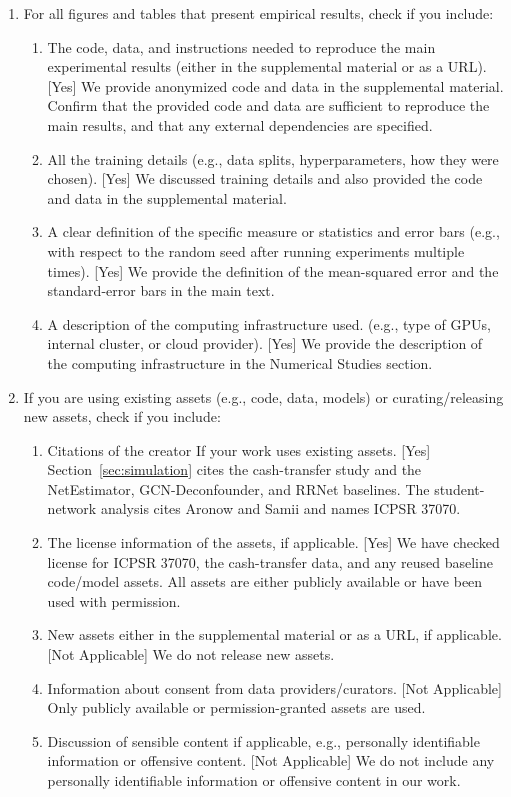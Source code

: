 \documentclass[twoside]{article}
\theoremstyle{plain}
\theoremstyle{definition}
\theoremstyle{remark}
\begin{document}
\begin{enumerate}
  \item For all figures and tables that present empirical results, check if you include:
  \begin{enumerate}
    \item The code, data, and instructions needed to reproduce the main experimental results (either in the supplemental material or as a URL). [Yes] We provide anonymized code and data in the supplemental material. Confirm that the provided code and data are sufficient to reproduce the main results, and that any external dependencies are specified.
    \item All the training details (e.g., data splits, hyperparameters, how they were chosen). [Yes] We discussed training details and also provided the code and data in the supplemental material.
    \item A clear definition of the specific measure or statistics and error bars (e.g., with respect to the random seed after running experiments multiple times). [Yes] We provide the definition of the mean-squared error and the standard-error bars in the main text.
    \item A description of the computing infrastructure used. (e.g., type of GPUs, internal cluster, or cloud provider). [Yes] We provide the description of the computing infrastructure in the Numerical Studies section.
  \end{enumerate}

  \item If you are using existing assets (e.g., code, data, models) or curating/releasing new assets, check if you include:
  \begin{enumerate}
    \item Citations of the creator If your work uses existing assets. [Yes] Section~\ref{sec:simulation} cites the cash-transfer study and the NetEstimator, GCN-Deconfounder, and RRNet baselines. The student-network analysis cites Aronow and Samii and names ICPSR 37070.
    \item The license information of the assets, if applicable. [Yes] We have checked license for ICPSR 37070, the cash-transfer data, and any reused baseline code/model assets. All assets are either publicly available or have been used with permission.
    \item New assets either in the supplemental material or as a URL, if applicable. [Not Applicable] We do not release new assets.
    \item Information about consent from data providers/curators. [Not Applicable] Only publicly available or permission-granted assets are used.
    \item Discussion of sensible content if applicable, e.g., personally identifiable information or offensive content. [Not Applicable] We do not include any personally identifiable information or offensive content in our work.
  \end{enumerate}


\end{enumerate}
\end{document}
